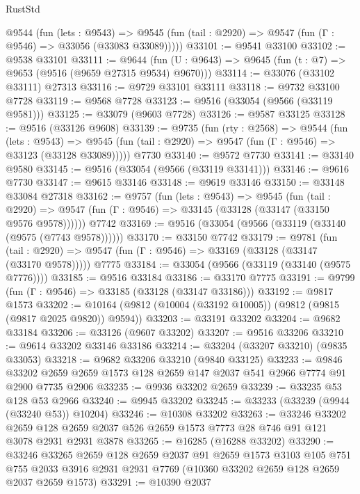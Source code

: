 \begin{lexlean}{RustStd}
\begin{coremodule}
    @9544
      (fun (lets : @9543) =>
      @9545 (fun (tail : @2920) => @9547 (fun (Γ : @9546) => @33056 (@33083 @33089)))))
@33101 := @9541 @33100
@33102 := @9538 @33101
@33111 := @9644
    (fun (U : @9643) => @9645 (fun (t : @7) => @9653 (@9516 (@9659 @27315 @9534) @9670)))
@33114 := @33076 (@33102 @33111) @27313
@33116 := @9729 @33101 @33111
@33118 := @9732 @33100 @7728
@33119 := @9568 @7728
@33123 := @9516 (@33054 (@9566 (@33119 @9581)))
@33125 := @33079 (@9603 @7728)
@33126 := @9587 @33125
@33128 := @9516 (@33126 @9608)
@33139 := @9735
    (fun (rty : @2568) =>
    @9544
      (fun (lets : @9543) =>
      @9545 (fun (tail : @2920) => @9547 (fun (Γ : @9546) => @33123 (@33128 @33089)))))
    @7730
@33140 := @9572 @7730
@33141 := @33140 @9580
@33145 := @9516 (@33054 (@9566 (@33119 @33141)))
@33146 := @9616 @7730
@33147 := @9615 @33146
@33148 := @9619 @33146
@33150 := @33148 @33084 @27318
@33162 := @9757
    (fun (lets : @9543) =>
    @9545
      (fun (tail : @2920) =>
      @9547 (fun (Γ : @9546) => @33145 (@33128 (@33147 (@33150 @9576 @9578))))))
    @7742
@33169 := @9516 (@33054 (@9566 (@33119 (@33140 (@9575 (@7743 @9578))))))
@33170 := @33150 @7742
@33179 := @9781
    (fun (tail : @2920) => @9547 (fun (Γ : @9546) => @33169 (@33128 (@33147 (@33170 @9578)))))
    @7775
@33184 := @33054 (@9566 (@33119 (@33140 (@9575 @7776))))
@33185 := @9516 @33184
@33186 := @33170 @7775
@33191 := @9799 (fun (Γ : @9546) => @33185 (@33128 (@33147 @33186)))
@33192 := @9817 @1573
@33202 := @10164 (@9812 (@10004 (@33192 @10005)) (@9812 (@9815 (@9817 @2025 @9820)) @9594))
@33203 := @33191 @33202
@33204 := @9682 @33184
@33206 := @33126 (@9607 @33202)
@33207 := @9516 @33206
@33210 := @9614 @33202 @33146 @33186
@33214 := @33204 (@33207 @33210) (@9835 @33053)
@33218 := @9682 @33206 @33210 (@9840 @33125)
@33233 := @9846
    @33202
    @2659
    @2659
    @1573
    @128
    @2659
    @147
    @2037
    @541
    @2966
    @7774
    @91
    @2900
    @7735
    @2906
@33235 := @9936 @33202 @2659
@33239 := @33235 @53 @128 @53 @2966
@33240 := @9945 @33202
@33245 := @33233 (@33239 (@9944 (@33240 @53)) @10204)
@33246 := @10308 @33202
@33263 := @33246
    @33202
    @2659
    @128
    @2659
    @2037
    @526
    @2659
    @1573
    @7773
    @28
    @746
    @91
    @121
    @3078
    @2931
    @2931
    @3878
@33265 := @16285 (@16288 @33202)
@33290 := @33246
    @33265
    @2659
    @128
    @2659
    @2037
    @91
    @2659
    @1573
    @3103
    @105
    @751
    @755
    @2033
    @3916
    @2931
    @2931
    @7769
    (@10360 @33202 @2659 @128 @2659 @2037 @2659 @1573)
@33291 := @10390 @2037

\end{coremodule}
\end{lexlean}
